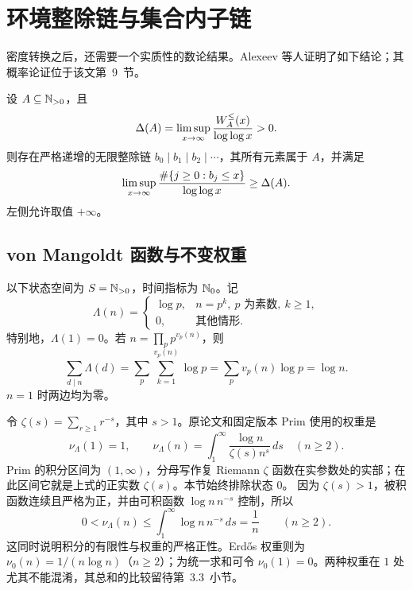 \section{环境整除链与集合内子链}\label{sec:chain}
密度转换之后，还需要一个实质性的数论结果。Alexeev 等人\cite[Theorem 1.6]{alexeev2026}证明了如下结论；其概率论证位于该文第~9~节。
\begin{theorem}\label{thm:upstream}
设 $A\subseteq\mathbb N_{>0}$，且
\[
 \Delta(A)=\limsup_{x\to\infty}\frac{W_A^{\le}(x)}{\log\log x}>0.
\]
则存在严格递增的无限整除链 $b_0\mid b_1\mid b_2\mid\cdots$，其所有元素属于 $A$，并满足
\begin{equation}\label{eq:upstream-bound}
 \limsup_{x\to\infty}\frac{\#\{j\ge0:b_j\le x\}}{\log\log x}\ge\Delta(A).
\end{equation}
左侧允许取值 $+\infty$。
\end{theorem}

\subsection{von Mangoldt 函数与不变权重}
以下状态空间为 $S=\mathbb N_{>0}$，时间指标为 $\mathbb N_0$。记
\[
 \Lambda(n)=\begin{cases}\log p,&n=p^k,\ p\text{ 为素数},\ k\ge1,\\0,&\text{其他情形}.
 \end{cases}
\]
特别地，$\Lambda(1)=0$。若 $n=\prod_p p^{v_p(n)}$，则
\begin{equation}\label{eq:mangoldt-divisors}
 \sum_{d\mid n}\Lambda(d)=\sum_p\sum_{k=1}^{v_p(n)}\log p
 =\sum_p v_p(n)\log p=\log n.
\end{equation}
$n=1$ 时两边均为零。

令 $\zeta(s)=\sum_{r\ge1}r^{-s}$，其中 $s>1$。原论文\cite[Example 2.8]{alexeev2026}和固定版本 Prim 使用的权重是
\begin{equation}\label{eq:mangoldt-weight-exact}
 \boxed{\nu_\Lambda(1)=1,\qquad
 \nu_\Lambda(n)=\int_1^\infty\frac{\log n}{\zeta(s)n^s}\,ds\quad(n\ge2).}
\end{equation}
Prim 的积分区间为 $(1,\infty)$，分母写作复 Riemann $\zeta$ 函数在实参数处的实部；在此区间它就是上式的正实数 $\zeta(s)$。本节始终排除状态 $0$。
因为 $\zeta(s)>1$，被积函数连续且严格为正，并由可积函数 $\log n\,n^{-s}$ 控制，所以
\[
 0<\nu_\Lambda(n)\le\int_1^\infty\log n\,n^{-s}\,ds=\frac1n
 \qquad(n\ge2).
\]
这同时说明积分的有限性与权重的严格正性。Erd\H{o}s 权重则为
$\nu_0(n)=1/(n\log n)$（$n\ge2$）；为统一求和可令 $\nu_0(1)=0$。两种权重在 $1$ 处尤其不能混淆，其总和的比较留待第~3.3~小节。

